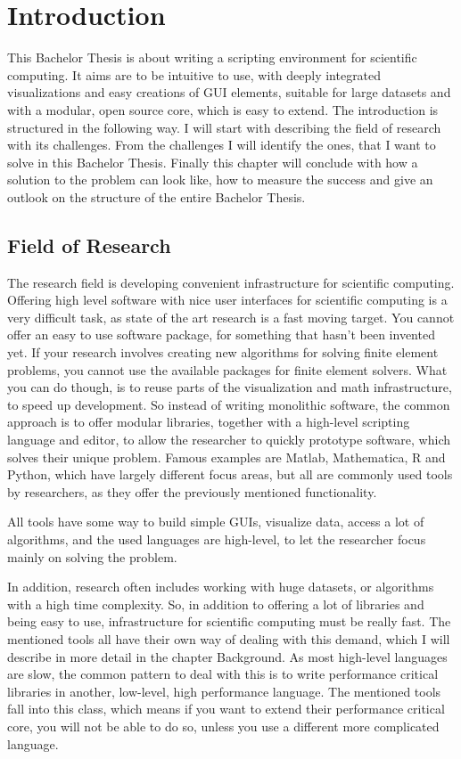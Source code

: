 \section{Introduction}
This Bachelor Thesis is about writing a scripting environment for scientific computing. 
It aims are to be intuitive to use, with deeply integrated visualizations and easy creations of GUI elements, suitable for large datasets and with a modular, open source core, which is easy to extend.
The introduction is structured in the following way.
I will start with describing the field of research with its challenges. 
From the challenges I will identify the ones, that I want to solve in this Bachelor Thesis.
Finally this chapter will conclude with how a solution to the problem can look like, how to measure the success and give an outlook on the structure of the entire Bachelor Thesis.
 
\subsection{Field of Research}
The research field is developing convenient infrastructure for scientific computing. Offering high level software with nice user interfaces for scientific computing is a very difficult task, as state of the art research is a fast moving target. You cannot offer an easy to use software package, for something that hasn't been invented yet. If your research involves creating new algorithms for solving finite element problems, you cannot use the available packages for finite element solvers. 
What you can do though, is to reuse parts of the visualization and math infrastructure, to speed up development. 
So instead of writing monolithic software, the common approach is to offer modular libraries, together with a high-level scripting language and editor, to allow the researcher to quickly prototype software, which solves their unique problem.
Famous examples are Matlab, Mathematica, R and Python, which have largely different focus areas, but all are commonly used tools by researchers, as they offer the previously mentioned functionality.

All tools have some way to build simple GUIs, visualize data, access a lot of algorithms, and the used languages are high-level, to let the researcher focus mainly on solving the problem.

In addition, research often includes working with huge datasets, or algorithms with a high time complexity.
So, in addition to offering a lot of libraries and being easy to use, infrastructure for scientific computing must be really fast.
The mentioned tools all have their own way of dealing with this demand, which I will describe in more detail in the chapter Background.
As most high-level languages are slow, the common pattern to deal with this is to write performance critical libraries in another, low-level, high performance language. The mentioned tools fall into this class, which means if you want to extend their performance critical core, you will not be able to do so, unless you use a different more complicated language.
 
